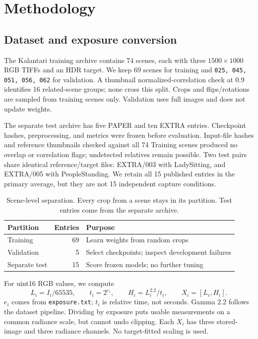 \documentclass{article}
\begin{document}
\section{Methodology}
\subsection{Dataset and exposure conversion}
The Kalantari training archive contains 74 scenes, each with three $1500\times1000$ RGB TIFFs and an HDR target. We keep 69 scenes for training and \texttt{025, 045, 051, 056, 062} for validation. A thumbnail normalized-correlation check at 0.9 identifies 16 related-scene groups; none cross this split. Crops and flips/rotations are sampled from training scenes only. Validation uses full images and does not update weights.

The separate test archive has five PAPER and ten EXTRA entries. Checkpoint hashes, preprocessing, and metrics were frozen before evaluation. Input-file hashes and reference thumbnails checked against all 74 Training scenes produced no overlap or correlation flags; undetected relatives remain possible. Two test pairs share identical reference/target files: EXTRA/003 with LadySitting, and EXTRA/005 with PeopleStanding. We retain all 15 published entries in the primary average, but they are not 15 independent capture conditions.

\begin{table}[t]
\centering
\small
\begin{tabular}{lrl}
\hline
Partition & Entries & Purpose \\
\hline
Training & 69 & Learn weights from random crops \\
Validation & 5 & Select checkpoints; inspect development failures \\
Separate test & 15 & Score frozen models; no further tuning \\
\hline
\end{tabular}
\caption{Scene-level separation. Every crop from a scene stays in its partition. Test entries come from the separate archive.}
\label{tab:split}
\end{table}

For uint16 RGB values, we compute
\begin{equation}
L_i=I_i/65535,\qquad t_i=2^{e_i},\qquad H_i=L_i^{2.2}/t_i,\qquad X_i=[L_i,H_i].
\end{equation}
$e_i$ comes from \texttt{exposure.txt}; $t_i$ is relative time, not seconds. Gamma 2.2 follows the dataset pipeline. Dividing by exposure puts usable measurements on a common radiance scale, but cannot undo clipping. Each $X_i$ has three stored-image and three radiance channels. No target-fitted scaling is used.
\end{document}
